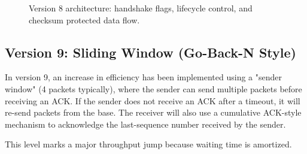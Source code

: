 \begin{figure}[h!]
{%
}
\caption{Version 8 architecture: handshake flags, lifecycle control, and checksum protected data flow.
}
\label{fig:v8-architecture}
\end{figure}

\clearpage
\subsection{Version 9: Sliding Window (Go-Back-N Style)}
In version 9, an increase in efficiency has been implemented using a "sender
window" (4 packets typically), where the sender can send multiple packets
before receiving an ACK. If the sender does not receive an ACK after a
timeout, it will re-send packets from the base. The receiver will also use a
cumulative ACK-style mechanism to acknowledge the last-sequence number
received by the sender.

This level marks a major throughput jump because waiting time is amortized.

